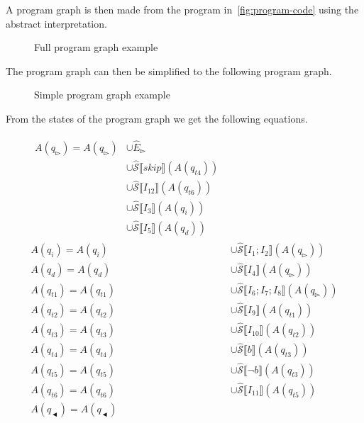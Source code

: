A program graph is then made from the program in~\autoref{fig:program-code} using the abstract interpretation.

\begin{figure}
    \centering
    
    \caption[short]{Full program graph example}
    \label{fig:full-graph-example}
\end{figure}


The program graph can then be simplified to the following program graph.

\begin{figure}
    \centering
    
    \caption[short]{Simple program graph example}
    \label{fig:simple-graph-example}
\end{figure}

From the states of the program graph we get the following equations.

\begin{align}\label{eq:exaple-equation}
\begin{split}
    A(q_\whitepointerright)=A(q_\whitepointerright) &\cup \hat E_\whitepointerright \\&\cup \mathcal{\hat S} \lBrack skip \rBrack(A(q_{t4}))\\&\cup \mathcal{\hat S} \lBrack I_{12} \rBrack (A(q_{t6})) \\&\cup \mathcal{\hat S} \lBrack I_3 \rBrack (A(q_i)) \\&\cup \mathcal{\hat S} \lBrack I_5 \rBrack (A(q_d))
\end{split}\\
A(q_i)=A(q_i)&\cup \mathcal{\hat S} \lBrack I_1;I_2 \rBrack (A(q_\whitepointerright ))\\
A(q_d)=A(q_d)&\cup \mathcal{\hat S} \lBrack I_4 \rBrack (A(q_\whitepointerright ))\\
A(q_{t1})=A(q_{t1})&\cup \mathcal{\hat S} \lBrack I_6;I_7;I_8 \rBrack (A(q_\whitepointerright))\\
A(q_{t2})=A(q_{t2})&\cup \mathcal{\hat S} \lBrack I_9 \rBrack (A(q_{t1}))\\
A(q_{t3})=A(q_{t3})&\cup \mathcal{\hat S} \lBrack I_{10} \rBrack (A(q_{t2}))\\
A(q_{t4})=A(q_{t4})&\cup \mathcal{\hat S} \lBrack b \rBrack (A(q_{t3}))\\
A(q_{t5})=A(q_{t5})&\cup \mathcal{\hat S} \lBrack \neg b \rBrack (A(q_{t3}))\\
A(q_{t6})=A(q_{t6})&\cup \mathcal{\hat S} \lBrack I_{11} \rBrack (A(q_{t5}))\\
A(q_\blackpointerleft)=A(q_\blackpointerleft)
\end{align}


